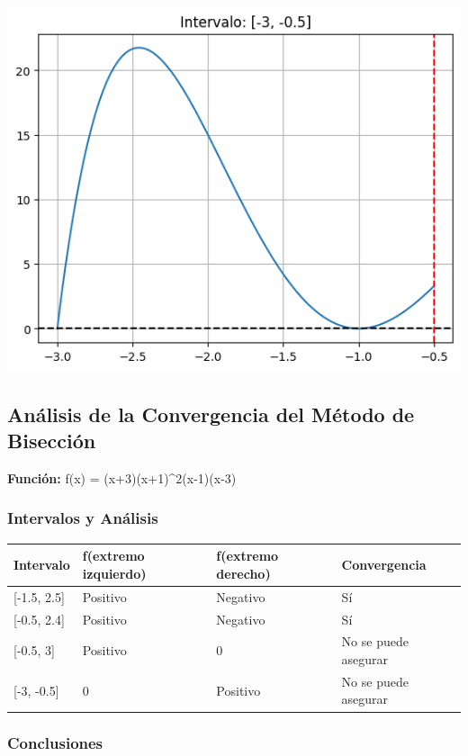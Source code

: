 \documentclass[
  letterpaper,
  DIV=11,
  numbers=noendperiod]{scrartcl}
\begin{document}
\includegraphics{Deber3_files/figure-pdf/cell-6-output-8.png}

\subsection{Análisis de la Convergencia del Método de
Bisección}\label{anuxe1lisis-de-la-convergencia-del-muxe9todo-de-bisecciuxf3n}

\textbf{Función:} f(x) = (x+3)(x+1)\^{}2(x-1)(x-3)

\subsubsection{Intervalos y Análisis}\label{intervalos-y-anuxe1lisis}

\begin{longtable}[]{@{}llll@{}}
\toprule\noalign{}
Intervalo & f(extremo izquierdo) & f(extremo derecho) & Convergencia \\
\midrule\noalign{}
\endhead
\bottomrule\noalign{}
\endlastfoot
{[}-1.5, 2.5{]} & Positivo & Negativo & Sí \\
{[}-0.5, 2.4{]} & Positivo & Negativo & Sí \\
{[}-0.5, 3{]} & Positivo & 0 & No se puede asegurar \\
{[}-3, -0.5{]} & 0 & Positivo & No se puede asegurar \\
\end{longtable}

\subsubsection{Conclusiones}\label{conclusiones}
\end{document}
